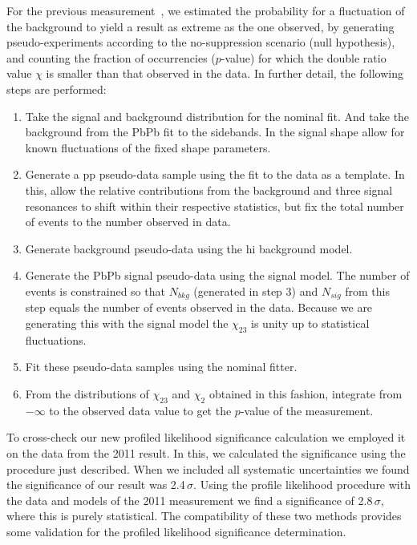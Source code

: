 For the previous measurement~\cite{prl}, we estimated the probability
for a fluctuation of the background to yield a result as extreme as
the one observed, by generating pseudo-experiments according to the
no-suppression scenario (null hypothesis), and counting the fraction
of occurrencies ($p$-value) for which the double ratio value $\chi$ is
smaller than that observed in the data.
In further detail, the following steps are performed:
%
\begin{enumerate}
\item Take the signal and background distribution for the nominal
  \Pp\Pp{} fit.  And take the background from the PbPb fit to the
  sidebands.  In the signal shape allow for known fluctuations of the
  fixed shape parameters.
\item Generate a pp pseudo-data sample using the fit to the \Pp\Pp{}
  data as a template.  In this, allow the relative contributions from
  the background and three signal resonances to shift within their
  respective statistics, but fix the total number of events to the
  number observed in data.
\item Generate background pseudo-data using the hi background model.
\item Generate the PbPb signal pseudo-data using the \Pp\Pp{} signal
  model.  The number of events is constrained so that $N_{bkg}$
  (generated in step 3) and $N_{sig}$ from this step equals the number
  of events observed in the data.  Because we are generating this with
  the \Pp\Pp{} signal model the $\chi_{23}$ is unity up to statistical
  fluctuations.
\item Fit these pseudo-data samples using the nominal fitter.
\item From the distributions of $\chi_{23}$ and $\chi_2$ obtained in
  this fashion, integrate from $-\infty$ to the observed data value to
  get the $p$-value of the measurement.
\end{enumerate}
%

To cross-check our new profiled likelihood significance calculation we
employed it on the data from the 2011 result\cite{prl}.  In this, we
calculated the significance using the procedure just described.  When
we included all systematic uncertainties we found the significance of
our result was 2.4$\,\sigma$.  Using the profile likelihood procedure
with the data and models of the 2011 measurement we find a
significance of 2.8$\,\sigma$, where this is purely statistical.  The
compatibility of these two methods provides some validation for the
profiled likelihood significance determination.

